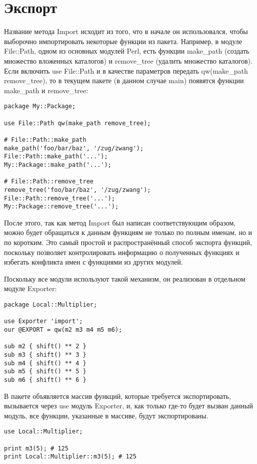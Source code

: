 \section{Экспорт} %
Название метода Import исходит из того, что в начале он использовался, чтобы выборочно импортировать некоторые функции из пакета. Например, в модуле File::Path, одном из основных модулей Perl, есть функции make\_path (создать множество вложенных каталогов) и remove\_tree (удалить множество каталогов). Если включить use File::Path и в качестве параметров передать qw(make\_path remove\_tree), то в текущем пакете (в данном случае main) появятся функции make\_path и remove\_tree:
\begin{verbatim}
package My::Package;

use File::Path qw(make_path remove_tree);

# File::Path::make_path
make_path('foo/bar/baz', '/zug/zwang');
File::Path::make_path('...');
My::Package::make_path('...');

# File::Path::remove_tree
remove_tree('foo/bar/baz', '/zug/zwang');
File::Path::remove_tree('...');
My::Package::remove_tree('...');
\end{verbatim}
После этого, так как метод Import был написан соответствующим образом, можно будет обращаться к данным функциям не только по полным именам, но и по коротким. Это самый простой и распространённый способ экспорта функций, поскольку позволяет контролировать информацию о полученных функциях и избегать конфликта имен с функциями из других модулей.

Поскольку все модули используют такой механизм, он реализован в отдельном модуле Exporter:
\begin{verbatim}
package Local::Multiplier;

use Exporter 'import';
our @EXPORT = qw(m2 m3 m4 m5 m6);

sub m2 { shift() ** 2 }
sub m3 { shift() ** 3 }
sub m4 { shift() ** 4 }
sub m5 { shift() ** 5 }
sub m6 { shift() ** 6 }
\end{verbatim}
В пакете объявляется массив функций, которые требуется экспортировать, вызывается через use модуль Exporter, и, как только где-то будет вызван данный модуль, все функции, указанные в массиве, будут экспортированы.
\begin{verbatim}
use Local::Multiplier;

print m3(5); # 125
print Local::Multiplier::m3(5); # 125
\end{verbatim}

